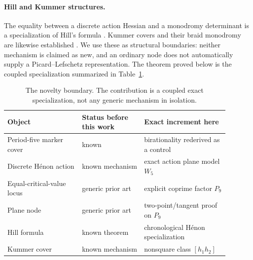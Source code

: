 \paragraph{Hill and Kummer structures.}
The equality between a discrete action Hessian and a monodromy determinant
is a specialization of Hill's formula \citep{bolotintreschev2010}.  Kummer
covers and their braid monodromy are likewise established
\citep{artal2014}.  We use these as structural boundaries: neither mechanism
is claimed as new, and an ordinary node does not automatically supply a
Picard--Lefschetz representation.  The theorem proved below is the coupled
specialization summarized in Table~\ref{tab:boundary}.

\begin{table}[t]
\centering
\small
\begin{tabular}{p{0.30\linewidth}p{0.25\linewidth}p{0.34\linewidth}}
\toprule
Object & Status before this work & Exact increment here \\
\midrule
Period-five marker cover & known & birationality rederived as a control \\
Discrete H\'enon action & known mechanism & exact action plane model \(W_5\) \\
Equal-critical-value locus & generic prior art & explicit coprime factor \(P_9\) \\
Plane node & generic prior art & two-point/tangent proof on \(P_9\) \\
Hill formula & known theorem & chronological H\'enon specialization \\
Kummer cover & known mechanism & nonsquare class \([h_1h_2]\) \\
\bottomrule
\end{tabular}
\caption{The novelty boundary.  The contribution is a coupled exact
specialization, not any generic mechanism in isolation.}
\label{tab:boundary}
\end{table}

